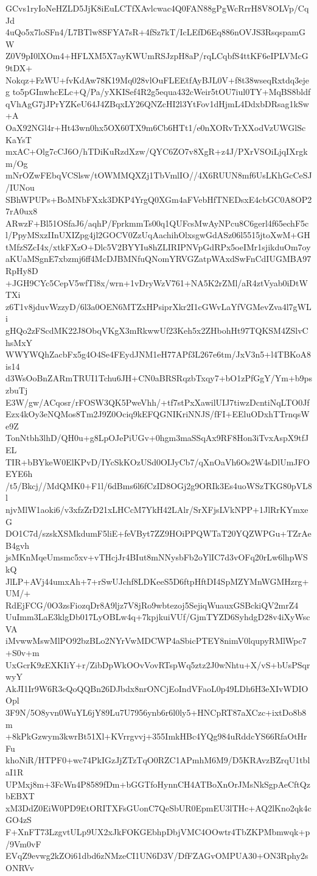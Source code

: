 GCvs1ryIoNeHZLD5JjK8iEuLCTfXAvlcwac4Q0FAN88gPgWcRrrH8V8OLVp/CqJd
4uQo5x7loSFn4/L7BTlw8SFYA7sR+4fSz7kT/IcLEfD6Eq886nOVJS3RsqspamGW
Z0V9pI0lXOm4+HFLXM5X7ayKWUmRSJzpH8aP/rqLCqbfS4ttKF6eIPLVMcG9tDX+
Nokqz+FzWU+fvKdAw78K19Mq028vlOuFLEEtfAyBJL0V+f8t38wseqRxtdq3ejeg
to5pGInwhcELc+Q/Pa/yXKISef4R2g5equa432cWeir5tOU7iul0TY+MqBS8bldf
qVhAgG7jJPrYZKeU64J4ZBqxLY26QNZcHI2l3YtFov1dHjmL4DdxbDRsag1kSw+A
OaX92NGl4r+Ht43wn0hx5OX60TX9m6Cb6HTt1/e0nXORvTrXXodVzUWGlScKaYsT
mxAC+Olg7cCJ6O/hTDiKuRzdXzw/QYC6ZO7v8XgR+z4J/PXrVSOiLjqIXrgkm/Og
mNrOZwFEbqVCSlsw/tOWMMQXZj1TbVmlIO//4X6RUUN8mf6UsLKhGcCeSJ/IUNou
SBhWPUPs+BoMNbFXxk3DKP4YrgQ0XGm4aFVebHfTNEDsxE4cbGC0A8OP27rA0ux8
ARwzF+Bl51OSfaJ6/aqhP/FprkmmTs00q1QUFcsMwAyNPcu8C6gerl4f65echF5c
l/PpyMSxzIInUXIZpg4jl2GOCV0ZzUqAachihOlxsgwGdASz06l5515jtoXwM+GH
tMfzSZcI4x/xtkFXzO+Dlc5V2BYYIu8hZLIRIPNVpGdRPx5oeIMr1sjikduOm7oy
aKUaMSgnE7xbzmj6ff4McDJBMNfuQNomYRVGZatpWAxdSwFnCdIUGMBA97RpHy8D
+JGH9CYc5CepV5wfTl8x/wrn+1vDryWzV761+NA5K2rZMl/aR4ztVyab0iDtWTXi
z6T1v8jduvWzzyD/6l3a0OEN6MTZxHPsiprXkr2I1cGWvLaYfVGMevZva4l7gWLi
gHQo2zFScdMK22J8ObqVKgX3mRkwwUf23Keh5x2ZHbohHt97TQKSM4ZSlvChsMxY
WWYWQhZacbFx5g4O4Se4FEydJNM1eH77APf3L267e6tm/JxV3n5+l4TBKoA8is14
d3WsOoBnZARmTRUI1Tchu6JH+CN0aBRSRqzbTxqy7+bO1zPfGgY/Ym+b9pszbuTj
E3W/gw/ACqosr/rFOSW3QK5PweVhh/+tf7stPxXawilUIJ7tiwzDcntiNqLTO0Jf
Ezx4kOy3eNQMos8Tm2J9Z0Ociq9kEFQGNIKriNNJS/fFI+EEluODxhTTrnqsWe9Z
TonNtbh3lhD/QH0u+g8LpOJePiUGv+0hgm3maSSqAx9RF8Hon3iTvxAspX9tfJEL
TIR+bBYkeW0ElKPvD/IYcSkKOzUSd0OIJyCb7/qXnOaVh6Os2W4sDlUmJFOEYE6h
/t5/Bkcj//MdQMK0+F1l/6dBms6l6fCzID8OGj2g9ORIk3Es4uoWSzTKG80pVL8l
njvMlW1aoki6/v3xfzZrD21xLHCcM7YkH42LAlr/SrXFjsLVkNPP+1JlRrKYmxeG
DO1C7d/szskXSMkdumF5liE+feVByt7ZZ9HOiPPQWTaT20YQZWPGu+TZrAeB4gvh
jsMKnMqeUmsmc5xv+vTHcjJr4BIut8mNNysbFb2oYlIC7d3vOFq20rLw6lhpWSkQ
JlLP+AVj44umxAh+7+rSwUJchf8LDKeeS5D6ftpHftDI4SpMZYMnWGMHzrg+UM/+
RdEjFCG/0O3zsFiozqDr8A9ljz7V8jRo9wbtezoj5SejiqWuauxGSBckiQV2mrZ4
UuImm3LaE3klgDb017LyOBLw4q+7kpjkuiVUf/GjmTYZD6SyhdgD28v4iXyWscVA
iMvwwMswMlPO92bzBLo2NYrVwMDCWP4aSbicPTEY8nimV0lqupyRMlWpc7+S0v+m
UxGcrK9zEXKIiY+r/ZibDpWkOOvVovRTspWq5ztz2J0wNhtu+X/vS+bUsPSqrwyY
AkJI1Ir9W6R3cQoQQBn26DJbdx8nrONCjEoIndVFaoL0p49LDh6H3eXIvWDIOOpl
3F9N/5O8yvn0WuYL6jY89Lu7U7956ynb6r6l0ly5+HNCpRT87aXCzc+ixtDo8b8m
+8kPkGzwym3kwrBt51Xl+KVrrgvvj+355ImkHBc4YQg984uRddcYS66RfaOtHrFu
khoNiR/HTPF0+wc74PkIGzJjZTzTqO0RZC1APmhM6M9/D5KRAvzBZrqU1tblaI1R
UPMxj8m+3FcWn4P8589fDm+bGGTfoHynnCH4ATBoXnOrJMsNkSgpAeCftQzbEBXT
xM3DdZ0EiW0PD9EtORITXFsGUonC7QeSbUR0EpmEU3lTHc+AQ2lKno2qk4cGO4zS
F+XnFT73LzgvtULp9UX2xJkFOKGEbhpDbjVMC4OOwtr4TbZKPMbmwqk+p/9Vm0vF
EVqZ9evwg2kZOi61dbd6zNMzeCI1UN6D3V/DfFZAGvOMPUA30+ON3Rphy2sONRVv
